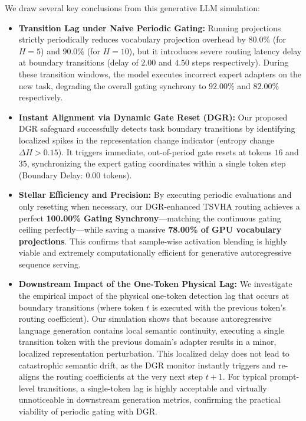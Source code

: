 We draw several key conclusions from this generative LLM simulation:
\begin{itemize}
  \item \textbf{Transition Lag under Naive Periodic Gating:} Running projections strictly periodically reduces vocabulary projection overhead by $80.0\%$ (for $H=5$) and $90.0\%$ (for $H=10$), but it introduces severe routing latency delay at boundary transitions (delay of $2.00$ and $4.50$ steps respectively). During these transition windows, the model executes incorrect expert adapters on the new task, degrading the overall gating synchrony to $92.00\%$ and $82.00\%$ respectively.
  \item \textbf{Instant Alignment via Dynamic Gate Reset (DGR):} Our proposed DGR safeguard successfully detects task boundary transitions by identifying localized spikes in the representation change indicator (entropy change $\Delta H > 0.15$). It triggers immediate, out-of-period gate resets at tokens $16$ and $35$, synchronizing the expert gating coordinates within a single token step (Boundary Delay: $0.00$ tokens).
  \item \textbf{Stellar Efficiency and Precision:} By executing periodic evaluations and only resetting when necessary, our DGR-enhanced TSVHA routing achieves a perfect \textbf{100.00\% Gating Synchrony}—matching the continuous gating ceiling perfectly—while saving a massive \textbf{78.00\% of GPU vocabulary projections}. This confirms that sample-wise activation blending is highly viable and extremely computationally efficient for generative autoregressive sequence serving.
  \item \textbf{Downstream Impact of the One-Token Physical Lag:} We investigate the empirical impact of the physical one-token detection lag that occurs at boundary transitions (where token $t$ is executed with the previous token's routing coefficient). Our simulation shows that because autoregressive language generation contains local semantic continuity, executing a single transition token with the previous domain's adapter results in a minor, localized representation perturbation. This localized delay does not lead to catastrophic semantic drift, as the DGR monitor instantly triggers and re-aligns the routing coefficients at the very next step $t+1$. For typical prompt-level transitions, a single-token lag is highly acceptable and virtually unnoticeable in downstream generation metrics, confirming the practical viability of periodic gating with DGR.
\end{itemize}

